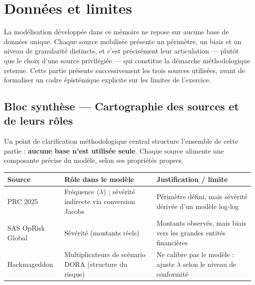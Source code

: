 \documentclass[11pt,a4paper]{article}
\theoremstyle{navystyle}
\theoremstyle{navydef}
\begin{document}
\section{Données et limites}

La modélisation développée dans ce mémoire ne repose sur aucune base de
données unique. Chaque source mobilisée présente un périmètre, un biais et un
niveau de granularité distincts, et c'est précisément leur articulation ---
plutôt que le choix d'une source \og privilégiée\fg{} --- qui constitue la
démarche méthodologique retenue. Cette partie présente successivement les
trois sources utilisées, avant de formaliser un cadre épistémique explicite
sur les limites de l'exercice.

\subsection*{Bloc synthèse --- Cartographie des sources et de leurs rôles}

Un point de clarification méthodologique central structure l'ensemble de
cette partie : \textbf{aucune base n'est utilisée seule}. Chaque source
alimente une composante précise du modèle, selon ses propriétés propres.

\begin{center}
\renewcommand{\arraystretch}{1.3}
\begin{tabular}{>{\raggedright}p{3cm} >{\raggedright}p{5.5cm} >{\raggedright\arraybackslash}p{5.5cm}}
\toprule
\rowcolor{lightblue}
\textbf{Source} & \textbf{Rôle dans le modèle} & \textbf{Justification / limite} \\
\midrule
PRC 2025 & Fréquence ($\lambda$) ; sévérité indirecte via conversion Jacobs &
Périmètre défini, mais sévérité dérivée d'un modèle log-log \\
\addlinespace
SAS OpRisk Global & Sévérité (montants réels) &
Montants observés, mais biais vers les grandes entités financières \\
\addlinespace
Hackmageddon & Multiplicateurs de scénario DORA (structure du risque) &
Ne calibre pas le modèle : ajuste $\lambda$ selon le niveau de conformité \\
\bottomrule
\end{tabular}
\end{center}
\end{document}

